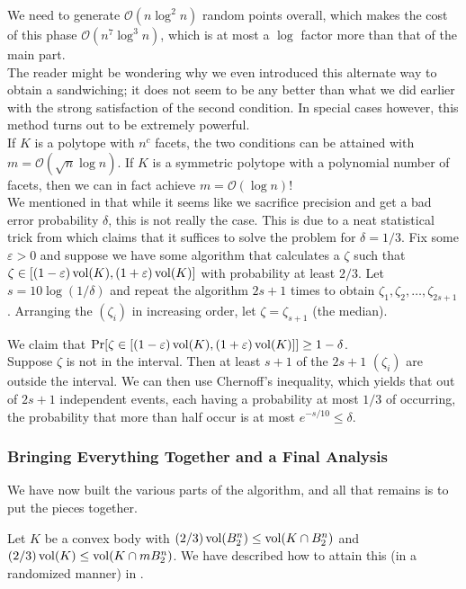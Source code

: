 We need to generate $\mathcal{O}(n\log^2 n)$ random points overall, which makes the cost of this phase $\mathcal{O}(n^7\log^3 n)$, which is at most a $\log$ factor more than that of the main part.\\

The reader might be wondering why we even introduced this alternate way to obtain a sandwiching; it does not seem to be any better than what we did earlier with the strong satisfaction of the second condition. In special cases however, this method turns out to be extremely powerful.\\
If $K$ is a polytope with $n^c$ facets, the two conditions can be attained with $m=\mathcal{O}(\sqrt{n}\log n)$. If $K$ is a symmetric polytope with a polynomial number of facets, then we can in fact achieve $m=\mathcal{O}(\log n)$!\\

We mentioned in  that while it seems like we sacrifice precision and get a bad error probability $\delta$, this is not really the case. This is due to a neat statistical trick from \cite{JerrumValiantVazirani1986} which claims that it suffices to solve the problem for $\delta=1/3$. Fix some $\varepsilon>0$ and suppose we have some algorithm that calculates a $\zeta$ such that $\zeta\in[(1-\varepsilon)\operatorname{vol}(K),(1+\varepsilon)\operatorname{vol}(K)]$ with probability at least $2/3$. Let $s=10\log(1/\delta)$ and repeat the algorithm $2s+1$ times to obtain $\zeta_1,\zeta_2,\ldots,\zeta_{2s+1}$. Arranging the $(\zeta_i)$ in increasing order, let $\zeta=\zeta_{s+1}$ (the median).

We claim that $\Pr[\zeta\in[(1-\varepsilon)\operatorname{vol}(K),(1+\varepsilon)\operatorname{vol}(K)]] \geq 1-\delta$.\\
Suppose $\zeta$ is not in the interval. Then at least $s+1$ of the $2s+1$ $(\zeta_i)$ are outside the interval. We can then use Chernoff's inequality, which yields that out of $2s+1$ independent events, each having a probability at most $1/3$ of occurring, the probability that more than half occur is at most $e^{-s/10}\leq\delta$.

\subsubsection{Bringing Everything Together and a Final Analysis}

We have now built the various parts of the algorithm, and all that remains is to put the pieces together.

Let $K$ be a convex body with $(2/3)\operatorname{vol}(B_2^n) \leq \operatorname{vol}(K\cap B_2^n)$ and $(2/3)\operatorname{vol}(K) \leq \operatorname{vol}(K\cap mB_2^n)$. We have described how to attain this (in a randomized manner) in .\\

